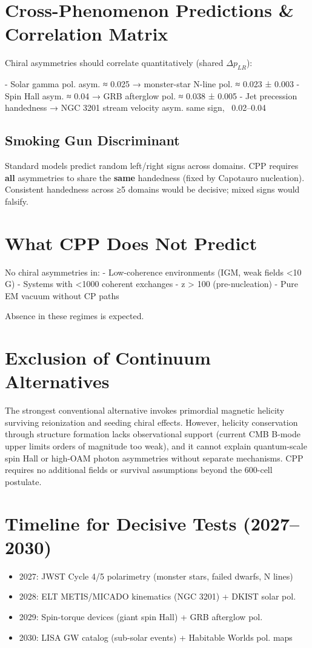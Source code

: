 \documentclass[11pt]{article}
\begin{document}
\section{Cross-Phenomenon Predictions \& Correlation Matrix}
Chiral asymmetries should correlate quantitatively (shared $\Delta p_{LR}$):

- Solar gamma pol. asym. ≈ 0.025 → monster-star N-line pol. ≈ 0.023 ± 0.003
- Spin Hall asym. ≈ 0.04 → GRB afterglow pol. ≈ 0.038 ± 0.005
- Jet precession handedness → NGC 3201 stream velocity asym. same sign, ~0.02–0.04

\subsection{Smoking Gun Discriminant}
Standard models predict random left/right signs across domains. CPP requires \textbf{all} asymmetries to share the \textbf{same} handedness (fixed by Capotauro nucleation). Consistent handedness across ≥5 domains would be decisive; mixed signs would falsify.

\section{What CPP Does Not Predict}
No chiral asymmetries in:
- Low-coherence environments (IGM, weak fields <10 G)
- Systems with <1000 coherent exchanges
- z > 100 (pre-nucleation)
- Pure EM vacuum without CP paths

Absence in these regimes is expected.

\section{Exclusion of Continuum Alternatives}
The strongest conventional alternative invokes primordial magnetic helicity surviving reionization and seeding chiral effects. However, helicity conservation through structure formation lacks observational support (current CMB B-mode upper limits orders of magnitude too weak), and it cannot explain quantum-scale spin Hall or high-OAM photon asymmetries without separate mechanisms. CPP requires no additional fields or survival assumptions beyond the 600-cell postulate.

\section{Timeline for Decisive Tests (2027–2030)}
\begin{itemize}[leftmargin=*]
    \item 2027: JWST Cycle 4/5 polarimetry (monster stars, failed dwarfs, N lines)
    \item 2028: ELT METIS/MICADO kinematics (NGC 3201) + DKIST solar pol.
    \item 2029: Spin-torque devices (giant spin Hall) + GRB afterglow pol.
    \item 2030: LISA GW catalog (sub-solar events) + Habitable Worlds pol. maps
\end{itemize}
\end{document}
